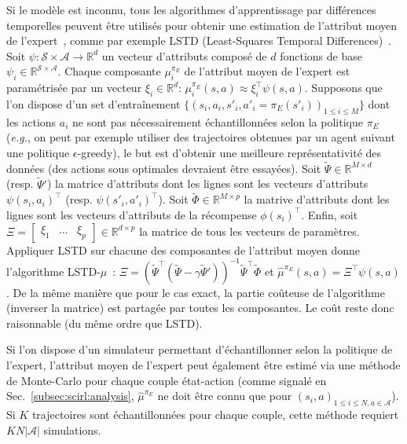 \documentclass[english,utf8]{./hermes-journal}
\newcommand{\s}{\mathcal{S}}
\newcommand{\A}{\mathcal{A}}
\begin{document}
Si le modèle est inconnu, tous les algorithmes d'apprentissage par différences temporelles peuvent être utilisés pour obtenir une estimation de l'attribut moyen de l'expert~\cite{Klein:2011}, comme par exemple LSTD (Least-Squares Temporal
Differences)~\cite{Bradtke:1996}. Soit $\psi:\s\times \A \rightarrow
\mathbb{R}^d$ un vecteur d'attributs composé de $d$ fonctions de base
$\psi_i \in\mathbb{R}^{\s\times \A}$. Chaque composante $\mu_i^{\pi_E}$
 de l'attribut moyen de l'expert est paramétrisée par un vecteur
$\xi_i\in\mathbb{R}^d$: $\mu_i^{\pi_E}(s,a)\approx \xi_i^\top
\psi(s,a)$. Supposons que l'on dispose d'un set d'entraînement
$\{(s_i,a_i,s'_i,a'_i=\pi_E(s'_i))_{1\leq i \leq M}\}$ dont les actions 
$a_i$ ne sont pas nécessairement échantillonnées selon la politique $\pi_E$
(\textit{e.g.}, on peut par exemple utiliser des trajectoires obtenues par un agent suivant une politique $\epsilon$-greedy), le but est d'obtenir une meilleure représentativité des données (des actions sous optimales devraient être essayées). Soit $\tilde{\Psi}\in \mathbb{R}^{M\times d}$
(resp. $\tilde{\Psi}'$) la matrice d'attributs dont les lignes sont les vecteurs d'attributs $\psi(s_i,a_i)^\top$ (resp. $\psi(s'_i,a'_i)^\top$).
Soit $\tilde{\Phi}\in \mathbb{R}^{M\times p}$ la matrive d'attributs dont les lignes sont les vecteurs d'attributs de la récompense $\phi(s_i)^\top$.
Enfin, soit $\Xi =
\begin{bmatrix}   \xi_1 & \dots & \xi_p
\end{bmatrix}\in\mathbb{R}^{d\times p}$ la matrice de tous les vecteurs de paramètres. Appliquer LSTD sur chacune des composantes de l'attribut moyen donne l'algorithme LSTD-$\mu$~\cite{Klein:2011}: $\Xi =
(\tilde{\Psi}^\top(\tilde{\Psi} - \gamma
\tilde{\Psi}'))^{-1}\tilde{\Psi}^\top \tilde{\Phi}$ et
$\hat{\mu}^{\pi_E}(s,a) = \Xi^\top \psi(s,a)$.
De la même manière que pour le cas exact, la partie coûteuse de l'algorithme (inverser la matrice) est partagée par toutes les composantes. Le coût reste donc raisonnable (du même ordre que LSTD).

%
Si l'on dispose d'un simulateur permettant d'échantillonner selon la politique de l'expert, l'attribut moyen de l'expert peut également être estimé via une méthode de Monte-Carlo pour chaque couple état-action (comme signalé en Sec.~\ref{subsec:scirl:analysis}, $\hat{\mu}^{\pi_E}$ ne doit être connu que pour $(s_i,a)_{1\leq i\leq N,a\in\A}$). Si $K$
trajectoires sont échantillonnées pour chaque couple, cette méthode requiert $KN|\A|$ simulations.
\end{document}

